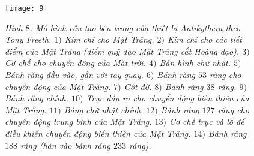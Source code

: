 \begin{figure}[H]
	\vspace*{5pt}
	\centering
	\captionsetup{labelformat= empty, justification=centering}
	\texttt{[image: 9]}
	\caption{\small\textit{\color{lichsutoanhoc}Hình $8$. Mô hình cấu tạo bên trong của thiết bị Antikythera theo Tony Freeth. $1)$ Kim chỉ cho Mặt Trăng. $2)$ Kim chỉ cho các tiết điểm của Mặt Trăng (điểm quỹ đạo Mặt Trăng cắt Hoàng đạo). $3)$ Cơ chế cho chuyển động của Mặt trời. $4)$ Bản hình chữ nhật. $5)$ Bánh răng đầu vào, gắn với tay quay. $6)$ Bánh răng $53$ răng cho chuyển động của Mặt Trăng. $7)$ Cột đỡ. $8)$ Bánh răng $38$ răng. $9)$ Bánh răng chính. $10)$ Trục đầu ra cho chuyển động biến thiên của Mặt Trăng. $11)$ Bảng chữ nhật chính. $12)$ Bánh răng $127$ răng cho chuyển động trung bình của Mặt Trăng. $13)$ Cơ chế trục và lỗ để điều khiển chuyển động biến thiên của Mặt Trăng. $14)$ Bánh răng $188$ răng (hàn vào bánh răng $233$ răng).}}
	\vspace*{-10pt}
\end{figure}
